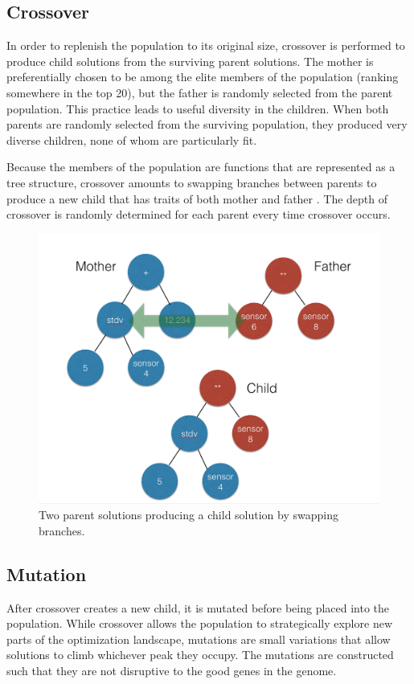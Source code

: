\documentclass{acm_proc_article-sp}
\begin{document}
\subsection{Crossover}
In order to replenish the population to its original size, crossover is performed to produce child solutions from the surviving parent solutions. The mother is preferentially chosen to be among the elite members of the population (ranking somewhere in the top 20), but the father is randomly selected from the parent population. This practice leads to useful diversity in the children. When both parents are randomly selected from the surviving population, they produced very diverse children, none of whom are particularly fit.

Because the members of the population are functions that are represented as a tree structure, crossover amounts to swapping branches between parents to produce a new child that has traits of both mother and father \cite{symbolic}. The depth of crossover is randomly determined for each parent every time crossover occurs.

\begin{figure}[!h]
\center
\includegraphics[scale=0.25]{crossover.png}
\caption {Two parent solutions producing a child solution by swapping branches.}
\label{fig:bullet}
\end{figure}

\subsection{Mutation}
After crossover creates a new child, it is mutated before being placed into the population. While crossover allows the population to strategically explore new parts of the optimization landscape, mutations are small variations that allow solutions to climb whichever peak they occupy. The mutations are constructed such that they are not disruptive to the good genes in the genome.
\end{document}
